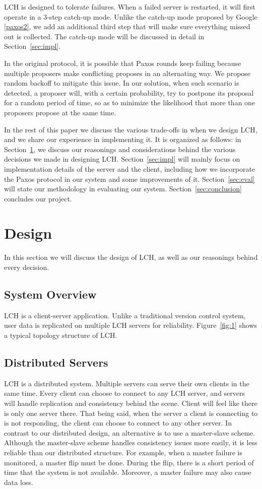 \documentclass[11pt]{article}
\begin{document}
LCH is designed to tolerate failures.
When a failed server is restarted, it will first operate in a 3-step catch-up mode.
Unlike the catch-up mode proposed by Google \ref{paxos2}, we add an additional third step that will make sure everything missed out is collected.
The catch-up mode will be discussed in detail in Section~\ref{sec:impl}.

In the original protocol, it is possible that Paxos rounds keep failing because multiple proposers make conflicting proposes in an alternating way.
We propose random backoff to mitigate this issue.
In our solution, when such scenario is detected, a proposer will, with a certain probability, try to postpone its proposal for a random period of time, so as to minimize the likelihood that more than one proposers propose at the same time.

In the rest of this paper we discuss the various trade-offs in when we design LCH, and we share our experience in implementing it.
It is organized as follows: in Section~\ref{sec:design}, we discuss our reasonings and considerations behind the various decisions we made in designing LCH.
Section~\ref{sec:impl} will mainly focus on implementation details of the server and the client, including how we incorporate the Paxos protocol in our system and some improvements of it.
Section~\ref{sec:eval} will state our methodology in evaluating our system.
Section~\ref{sec:conclusion} concludes our project.


\section{Design}
\label{sec:design}
In this section we will discuss the design of LCH, as well as our reasonings behind every decision.

\subsection{System Overview}
LCH is a client-server application.
Unlike a traditional version control system, user data is replicated on multiple LCH servers for reliability.
Figure~\ref{fig:1} shows a typical topology structure of LCH.

\subsection{Distributed Servers}
LCH is a distributed system.
Multiple servers can serve their own clients in the same time.
Every client can choose to connect to any LCH server, and servers will handle replication and consistency behind the scene.
Client will feel like there is only one server there.
That being said, when the server a client is connecting to is not responding, the client can choose to connect to any other server.
In contrast to our distributed design, an alternative is to use a master-slave scheme.
Although the master-slave scheme handles consistency issues more easily, it is less reliable than our distributed structure.
For example, when a master failure is monitored, a master flip must be done.
During the flip, there is a short period of time that the system is not available.
Moreover, a master failure may also cause data loss.
\end{document}
